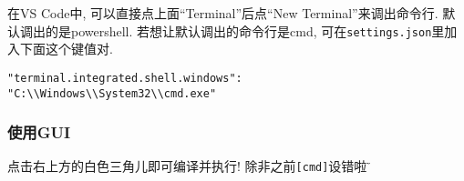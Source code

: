 在VS Code中, 可以直接点上面``Terminal''后点``New Terminal''来调出命令行. 默认调出的是powershell. 若想让默认调出的命令行是cmd, 可在\verb|settings.json|里加入下面这个键值对.
\begin{verbatim}
"terminal.integrated.shell.windows":
"C:\\Windows\\System32\\cmd.exe"
\end{verbatim}

\subsubsection{使用GUI}
点击右上方的白色三角儿即可编译并执行! 除非之前\verb|[cmd]|设错啦$\!\text{\~{}}$
